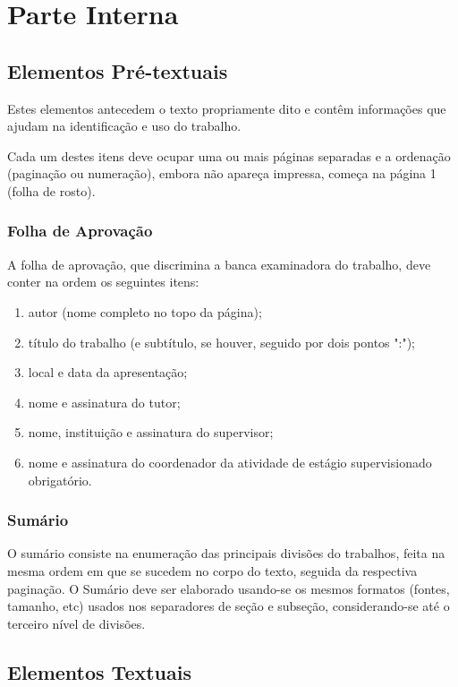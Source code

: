 \documentclass[repeatfields,xlists,xpacks,oneside,yearsonly]{ufrgscca}
\begin{document}
\section{Parte Interna}

\subsection{Elementos Pré-textuais}

Estes elementos antecedem o texto propriamente dito e contêm informações que
ajudam na identificação e uso do trabalho.

Cada um destes itens deve ocupar uma ou mais páginas separadas e a ordenação
(paginação ou numeração), embora não apareça impressa, começa na página 1
(folha de rosto).

\subsubsection{Folha de Aprovação}

A folha de aprovação, que discrimina a banca examinadora do trabalho, deve
conter na ordem os seguintes itens:

\begin{enumerate}
\item autor (nome completo no topo da página);
\item título do trabalho (e subtítulo, se houver, seguido por dois pontos ":");
\item local e data da apresentação;
\item nome e assinatura do tutor;
\item nome, instituição e assinatura do supervisor;
\item nome e assinatura do coordenador da atividade de estágio supervisionado obrigatório.
\end{enumerate}


\subsubsection{Sumário}

O sumário consiste na enumeração das principais divisões do trabalhos, feita
na mesma ordem em que se sucedem no corpo do texto, seguida da respectiva
paginação. O Sumário deve ser elaborado usando-se os mesmos formatos
(fontes, tamanho, etc) usados nos separadores de seção e subseção,
considerando-se até o terceiro nível de divisões.


\subsection{Elementos Textuais}
\end{document}
